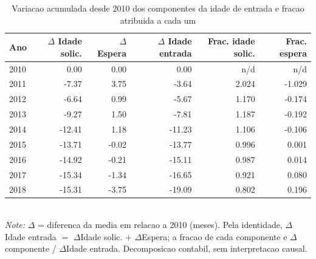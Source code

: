 \begin{table}[htbp]\centering
\caption{Variacao acumulada desde 2010 dos componentes da idade de entrada e fracao atribuida a cada um}
\label{tab:T3b_cumulativa}
\small
\setlength{\tabcolsep}{4pt}
\begin{tabular}{lrrrrr}
\toprule
Ano & $\Delta$ Idade solic. & $\Delta$ Espera & $\Delta$ Idade entrada & Frac. idade solic. & Frac. espera \\
\midrule
2010 & 0.00 & 0.00 & 0.00 & n/d & n/d \\
2011 & -7.37 & 3.75 & -3.64 & 2.024 & -1.029 \\
2012 & -6.64 & 0.99 & -5.67 & 1.170 & -0.174 \\
2013 & -9.27 & 1.50 & -7.81 & 1.187 & -0.192 \\
2014 & -12.41 & 1.18 & -11.23 & 1.106 & -0.106 \\
2015 & -13.71 & -0.02 & -13.77 & 0.996 & 0.001 \\
2016 & -14.92 & -0.21 & -15.11 & 0.987 & 0.014 \\
2017 & -15.34 & -1.34 & -16.65 & 0.921 & 0.080 \\
2018 & -15.31 & -3.75 & -19.09 & 0.802 & 0.196 \\
\bottomrule
\end{tabular}
\\[3pt]{\footnotesize \textit{Note:} $\Delta$ = diferenca da media em relacao a 2010 (meses). Pela identidade, $\Delta$Idade entrada $=$ $\Delta$Idade solic. $+$ $\Delta$Espera; a fracao de cada componente e $\Delta$componente / $\Delta$Idade entrada. Decomposicao contabil, sem interpretacao causal.}
\end{table}
